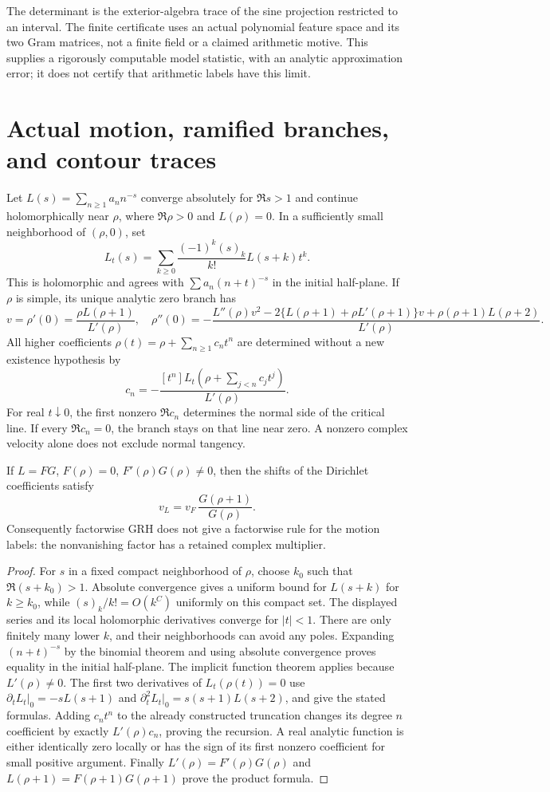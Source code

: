 The determinant is the exterior-algebra trace of the sine projection
restricted to an interval. The finite certificate uses an actual
polynomial feature space and its two Gram matrices, not a finite
field or a claimed arithmetic motive. This supplies a rigorously
computable model statistic, with an analytic approximation error;
it does not certify that arithmetic labels have this limit.


\section{Actual motion, ramified branches, and contour traces}

\begin{theorem}
Let $L(s)=\sum_{n\ge1}a_n n^{-s}$ converge absolutely for $\Re s>1$
and continue holomorphically near $\rho$, where $\Re\rho>0$ and
$L(\rho)=0$. In a sufficiently small neighborhood of $(\rho,0)$, set
\[
 L_t(s)=\sum_{k\ge0}\frac{(-1)^k(s)_k}{k!}L(s+k)t^k.
\]
This is holomorphic and agrees with $\sum a_n(n+t)^{-s}$ in the initial
half-plane. If $\rho$ is simple, its unique analytic zero branch has
\[
 v=\rho'(0)=\frac{\rho L(\rho+1)}{L'(\rho)},
\quad
 \rho''(0)=-\frac{L''(\rho)v^2
 -2\{L(\rho+1)+\rho L'(\rho+1)\}v
 +\rho(\rho+1)L(\rho+2)}{L'(\rho)}.
\]
All higher coefficients $\rho(t)=\rho+\sum_{n\ge1}c_nt^n$ are determined
without a new existence hypothesis by
\[
 c_n=-\frac{[t^n]L_t(\rho+\sum_{j<n}c_jt^j)}{L'(\rho)}.
\]
For real $t\downarrow0$, the first nonzero $\Re c_n$ determines the
normal side of the critical line. If every $\Re c_n=0$, the branch stays
on that line near zero. A nonzero complex velocity alone does not exclude
normal tangency.

If $L=FG$, $F(\rho)=0$, $F'(\rho)G(\rho)\ne0$, then the shifts of the
Dirichlet coefficients satisfy
\[
 v_L=v_F\,\frac{G(\rho+1)}{G(\rho)}.
\]
Consequently factorwise GRH does not give a factorwise rule for the motion
labels: the nonvanishing factor has a retained complex multiplier.
\end{theorem}
\begin{proof}
For $s$ in a fixed compact neighborhood of $\rho$, choose $k_0$ such that
$\Re(s+k_0)>1$. Absolute convergence gives a uniform bound for $L(s+k)$
for $k\ge k_0$, while $(s)_k/k!=O(k^C)$ uniformly on this compact set.
The displayed series and its local holomorphic derivatives converge for
$|t|<1$. There are only finitely many lower $k$, and their neighborhoods
can avoid any poles. Expanding $(n+t)^{-s}$ by the binomial theorem and
using absolute convergence proves equality in the initial half-plane.
The implicit function theorem applies because $L'(\rho)\ne0$.
The first two derivatives of $L_t(\rho(t))=0$ use
$\partial_tL_t|_0=-sL(s+1)$ and
$\partial_t^2L_t|_0=s(s+1)L(s+2)$, and give the stated formulas.
Adding $c_nt^n$ to the already constructed truncation changes its degree
$n$ coefficient by exactly $L'(\rho)c_n$, proving the recursion. A
real analytic function is either identically zero locally or has the sign
of its first nonzero coefficient for small positive argument. Finally
$L'(\rho)=F'(\rho)G(\rho)$ and
$L(\rho+1)=F(\rho+1)G(\rho+1)$ prove the product formula.
\end{proof}

